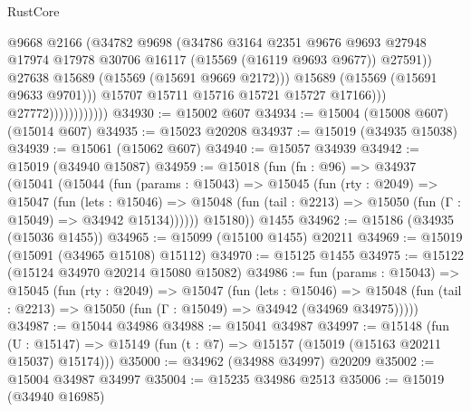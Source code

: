 \begin{lexlean}{RustCore}
\begin{coremodule}
                                      @9668
                                      @2166
                                      (@34782
                                        @9698
                                        (@34786
                                          @3164
                                          @2351
                                          @9676
                                          @9693
                                          @27948
                                          @17974
                                          @17978
                                          @30706
                                          @16117
                                          (@15569 (@16119 @9693 @9677))
                                          @27591))
                                      @27638
                                      @15689
                                      (@15569 (@15691 @9669 @2172)))
                                    @15689
                                    (@15569 (@15691 @9633 @9701)))
                                  @15707
                                  @15711
                                  @15716
                                  @15721
                                  @15727
                                  @17166)))
                            @27772))))))))))))
@34930 := @15002 @607
@34934 := @15004 (@15008 @607) (@15014 @607)
@34935 := @15023 @20208
@34937 := @15019 (@34935 @15038)
@34939 := @15061 (@15062 @607)
@34940 := @15057 @34939
@34942 := @15019 (@34940 @15087)
@34959 := @15018
    (fun (fn : @96) =>
    @34937
      (@15041
        (@15044
          (fun (params : @15043) =>
          @15045
            (fun (rty : @2049) =>
            @15047
              (fun (lets : @15046) =>
              @15048 (fun (tail : @2213) => @15050 (fun (Γ : @15049) => @34942 @15134))))))
        @15180))
    @1455
@34962 := @15186 (@34935 (@15036 @1455))
@34965 := @15099 (@15100 @1455) @20211
@34969 := @15019 (@15091 (@34965 @15108) @15112)
@34970 := @15125 @1455
@34975 := @15122 (@15124 @34970 @20214 @15080 @15082)
@34986 := fun (params : @15043) =>
  @15045
    (fun (rty : @2049) =>
    @15047
      (fun (lets : @15046) =>
      @15048 (fun (tail : @2213) => @15050 (fun (Γ : @15049) => @34942 (@34969 @34975)))))
@34987 := @15044 @34986
@34988 := @15041 @34987
@34997 := @15148
    (fun (U : @15147) => @15149 (fun (t : @7) => @15157 (@15019 (@15163 @20211 @15037) @15174)))
@35000 := @34962 (@34988 @34997) @20209
@35002 := @15004 @34987 @34997
@35004 := @15235 @34986 @2513
@35006 := @15019 (@34940 @16985)

\end{coremodule}
\end{lexlean}
